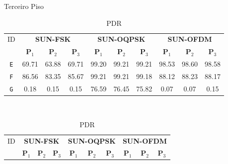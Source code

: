 \begin{table}
      \caption{Terceiro Piso}
      \begin{subtable}{\textwidth}
            \begin{center}
                  \begin{tabular}{|c|c|c|c|c|c|c|c|c|c|}
                        \hline
                        ID         & \multicolumn{3}{c|}{\textbf{SUN-FSK}} & \multicolumn{3}{c|}{\textbf{SUN-OQPSK}} & \multicolumn{3}{c|}{\textbf{SUN-OFDM}}                                                                                                       \\ \cline{2-10}
                                   & \textbf{P$_1$}                        & \textbf{P$_2$}                          & \textbf{P$_3$}                         & \textbf{P$_1$} & \textbf{P$_2$} & \textbf{P$_3$} & \textbf{P$_1$} & \textbf{P$_2$} & \textbf{P$_3$} \\ \hline
                        \texttt{E} & 69.71                                 & 63.88                                   & 69.71                                  & 99.20          & 99.21          & 99.21          & 98.53          & 98.60          & 98.58          \\ \hline
                        \texttt{F} & 86.56                                 & 83.35                                   & 85.67                                  & 99.21          & 99.21          & 99.18          & 88.12          & 88.23          & 88.17          \\ \hline
                        \texttt{G} & 0.18                                  & 0.15                                    & 0.15                                   & 76.59          & 76.45          & 75.82          & 0.07           & 0.07           & 0.15           \\ \hline
                  \end{tabular}
                  \caption{PDR}
                  \label{table:pdr3}
            \end{center}
      \end{subtable}%
      \\
      \par\bigskip
      \begin{subtable}{\textwidth}
            \begin{center}
                  \begin{tabular}{|c|c|c|c|c|c|c|c|c|c|}
                        \hline
                        ID         & \multicolumn{3}{c|}{\textbf{SUN-FSK}} & \multicolumn{3}{c|}{\textbf{SUN-OQPSK}} & \multicolumn{3}{c|}{\textbf{SUN-OFDM}}                                                                                                       \\ \cline{2-10}
                                   & \textbf{P$_1$}                        & \textbf{P$_2$}                          & \textbf{P$_3$}                         & \textbf{P$_1$} & \textbf{P$_2$} & \textbf{P$_3$} & \textbf{P$_1$} & \textbf{P$_2$} & \textbf{P$_3$} \\ \hline


\end{tabular}
\end{center}
\end{subtable}
\end{table}
